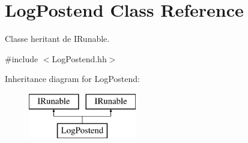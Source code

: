 \hypertarget{class_log_postend}{}\section{Log\+Postend Class Reference}
\label{class_log_postend}


Classe heritant de I\+Runable.  




{\ttfamily \#include $<$Log\+Postend.\+hh$>$}

Inheritance diagram for Log\+Postend\+:\begin{figure}[H]
\begin{center}
\leavevmode
\includegraphics[height=2.000000cm]{class_log_postend}
\end{center}
\end{figure}
